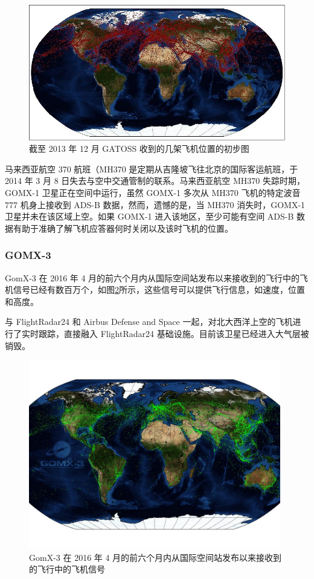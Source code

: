 \begin{figure}[!htb]
\centering
\includegraphics[width=13cm]{pic/GATOSS_Auto6.jpeg}
\caption{截至 2013 年 12 月 GATOSS 收到的几架飞机位置的初步图\protect\footnotemark}
\label{fig:GATOSS_Auto6}
\end{figure}


马来西亚航空 370 航班（MH370 是定期从吉隆坡飞往北京的国际客运航班，于 2014 年 3 月 8 日失去与空中交通管制的联系。马来西亚航空 MH370 失踪时期，GOMX-1 卫星正在空间中运行，虽然 GOMX-1 多次从 MH370 飞机的特定波音 777 机身上接收到 ADS-B 数据，然而，遗憾的是，当 MH370 消失时，GOMX-1 卫星并未在该区域上空。如果 GOMX-1 进入该地区，至少可能有空间 ADS-B 数据有助于准确了解飞机应答器何时关闭以及该时飞机的位置。

\subsubsection{GOMX-3}

GomX-3 在 2016 年 4 月的前六个月内从国际空间站发布以来接收到的飞行中的飞机信号已经有数百万个，如图\ref{fig:ef59906e566da47d7760e54dd9c6662d}所示，这些信号可以提供飞行信息，如速度，位置和高度。

与 FlightRadar24 和 Airbus Defense and Space 一起，对北大西洋上空的飞机进行了实时跟踪，直接融入 FlightRadar24 基础设施。目前该卫星已经进入大气层被销毁。

\begin{figure}[!htb]
\centering
\includegraphics[width=11cm]{pic/ef59906e566da47d7760e54dd9c6662d.jpg}
\caption{GomX-3 在 2016 年 4 月的前六个月内从国际空间站发布以来接收到的飞行中的飞机信号\protect\footnotemark}
\label{fig:ef59906e566da47d7760e54dd9c6662d}
\end{figure}

